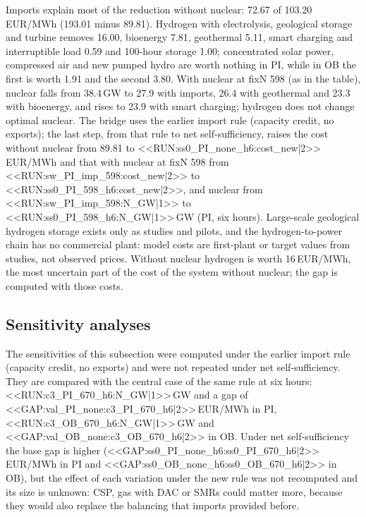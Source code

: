\begin{table}[htbp]
\centering
\caption{From the previous model to the present one, PI case, six hours, cumulative; cost in EUR/MWh. The last column is the change in cost of the system with nuclear. The OB case is Table~\ref{tab:bridgeob}.}\label{tab:bridgepi}

\end{table}

Imports explain most of the reduction without nuclear: 72.67 of 103.20\,EUR/MWh (193.01 minus 89.81). Hydrogen with electrolysis, geological storage and turbine removes 16.00, bioenergy 7.81, geothermal 5.11, smart charging and interruptible load 0.59 and 100-hour storage 1.00; concentrated solar power, compressed air and new pumped hydro are worth nothing in PI, while in OB the first is worth 1.91 and the second 3.80. With nuclear at fixN 598 (as in the table), nuclear falls from 38.4\,GW to 27.9 with imports, 26.4 with geothermal and 23.3 with bioenergy, and rises to 23.9 with smart charging; hydrogen does not change optimal nuclear. The bridge uses the earlier import rule (capacity credit, no exports); the last step, from that rule to net self-sufficiency, raises the cost without nuclear from 89.81 to <<RUN:ss0_PI_none_h6:cost_new|2>>\,EUR/MWh and that with nuclear at fixN 598 from <<RUN:sw_PI_imp_598:cost_new|2>> to <<RUN:ss0_PI_598_h6:cost_new|2>>, and nuclear from <<RUN:sw_PI_imp_598:N_GW|1>> to <<RUN:ss0_PI_598_h6:N_GW|1>>\,GW (PI, six hours). Large-scale geological hydrogen storage exists only as studies and pilots, and the hydrogen-to-power chain has no commercial plant: model costs are first-plant or target values from studies, not observed prices. Without nuclear hydrogen is worth 16\,EUR/MWh, the most uncertain part of the cost of the system without nuclear; the gap is computed with those costs.

\subsection{Sensitivity analyses}\label{sec:sens}
The sensitivities of this subsection were computed under the earlier import rule (capacity credit, no exports) and were not repeated under net self-sufficiency. They are compared with the central case of the same rule at six hours: <<RUN:c3_PI_670_h6:N_GW|1>>\,GW and a gap of <<GAP:val_PI_none:c3_PI_670_h6|2>>\,EUR/MWh in PI, <<RUN:c3_OB_670_h6:N_GW|1>>\,GW and <<GAP:val_OB_none:c3_OB_670_h6|2>> in OB. Under net self-sufficiency the base gap is higher (<<GAP:ss0_PI_none_h6:ss0_PI_670_h6|2>>\,EUR/MWh in PI and <<GAP:ss0_OB_none_h6:ss0_OB_670_h6|2>> in OB), but the effect of each variation under the new rule was not recomputed and its size is unknown: CSP, gas with DAC or SMRs could matter more, because they would also replace the balancing that imports provided before.

